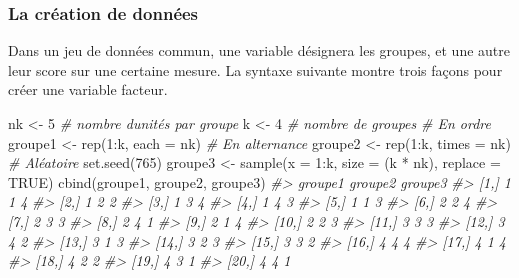 \documentclass[
]{book}
\newenvironment{Shaded}{}{}
\newcommand{\AttributeTok}[1]{#1}
\newcommand{\CommentTok}[1]{\textit{#1}}
\newcommand{\ConstantTok}[1]{#1}
\newcommand{\DecValTok}[1]{#1}
\newcommand{\FunctionTok}[1]{#1}
\newcommand{\NormalTok}[1]{#1}
\newcommand{\OtherTok}[1]{#1}
\newcommand{\SpecialCharTok}[1]{#1}
\begin{document}
\hypertarget{la-cruxe9ation-de-donnuxe9es}{%
\subsubsection{La création de données}\label{la-cruxe9ation-de-donnuxe9es}}

Dans un jeu de données commun, une variable désignera les groupes, et une autre leur score sur une certaine mesure. La syntaxe suivante montre trois façons pour créer une variable facteur.

\begin{Shaded}
\begin{Highlighting}[]
\NormalTok{nk }\OtherTok{\textless{}{-}} \DecValTok{5} \CommentTok{\# nombre d\textquotesingle{}unités par groupe}
\NormalTok{k }\OtherTok{\textless{}{-}} \DecValTok{4}  \CommentTok{\# nombre de groupes}
\CommentTok{\# En ordre}
\NormalTok{groupe1 }\OtherTok{\textless{}{-}} \FunctionTok{rep}\NormalTok{(}\DecValTok{1}\SpecialCharTok{:}\NormalTok{k, }\AttributeTok{each =}\NormalTok{ nk)}
\CommentTok{\# En alternance}
\NormalTok{groupe2 }\OtherTok{\textless{}{-}} \FunctionTok{rep}\NormalTok{(}\DecValTok{1}\SpecialCharTok{:}\NormalTok{k, }\AttributeTok{times =}\NormalTok{ nk)}
\CommentTok{\# Aléatoire}
\FunctionTok{set.seed}\NormalTok{(}\DecValTok{765}\NormalTok{)}
\NormalTok{groupe3 }\OtherTok{\textless{}{-}} \FunctionTok{sample}\NormalTok{(}\AttributeTok{x =} \DecValTok{1}\SpecialCharTok{:}\NormalTok{k, }\AttributeTok{size =}\NormalTok{ (k }\SpecialCharTok{*}\NormalTok{ nk), }\AttributeTok{replace =} \ConstantTok{TRUE}\NormalTok{)}
\FunctionTok{cbind}\NormalTok{(groupe1, groupe2, groupe3)}
\CommentTok{\#\textgreater{}       groupe1 groupe2 groupe3}
\CommentTok{\#\textgreater{}  [1,]       1       1       4}
\CommentTok{\#\textgreater{}  [2,]       1       2       2}
\CommentTok{\#\textgreater{}  [3,]       1       3       4}
\CommentTok{\#\textgreater{}  [4,]       1       4       3}
\CommentTok{\#\textgreater{}  [5,]       1       1       3}
\CommentTok{\#\textgreater{}  [6,]       2       2       4}
\CommentTok{\#\textgreater{}  [7,]       2       3       3}
\CommentTok{\#\textgreater{}  [8,]       2       4       1}
\CommentTok{\#\textgreater{}  [9,]       2       1       4}
\CommentTok{\#\textgreater{} [10,]       2       2       3}
\CommentTok{\#\textgreater{} [11,]       3       3       3}
\CommentTok{\#\textgreater{} [12,]       3       4       2}
\CommentTok{\#\textgreater{} [13,]       3       1       3}
\CommentTok{\#\textgreater{} [14,]       3       2       3}
\CommentTok{\#\textgreater{} [15,]       3       3       2}
\CommentTok{\#\textgreater{} [16,]       4       4       4}
\CommentTok{\#\textgreater{} [17,]       4       1       4}
\CommentTok{\#\textgreater{} [18,]       4       2       2}
\CommentTok{\#\textgreater{} [19,]       4       3       1}
\CommentTok{\#\textgreater{} [20,]       4       4       1}
\end{Highlighting}
\end{Shaded}
\end{document}
